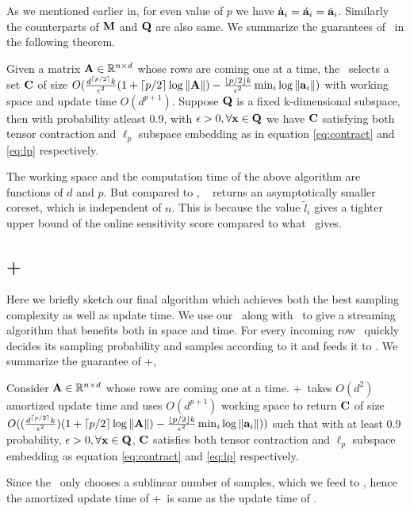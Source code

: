 As we mentioned earlier in, for even value of $p$ we have $\grave{\mathbf{a}}_{i}=\acute{\mathbf{a}}_{i}=\hat{\mathbf{a}}_{i}$. Similarly the counterparts of $\mathbf{M}$ and $\mathbf{Q}$ are also same. We summarize the guarantees of ~in the following theorem.
\begin{theorem}{\label{thm:slowOnline}}
 Given a matrix $\mathbf{A} \in \mathbb{R}^{n \times d}$ whose rows are coming one at a time, the ~selects a set $\mathbf{C}$ of size $O(\frac{d^{\lceil p/2 \rceil}k}{\epsilon^{2}}(1+\lceil p/2 \rceil\log \|\mathbf{A}\|) - \frac{\lfloor p/2 \rfloor k}{\epsilon^2}\min_{i}\log \|\mathbf{a}_{i}\|)$ with working space and update time $O(d^{p+1})$. Suppose $\mathbf{Q}$ is a fixed k-dimensional subspace, then with probability atleast 0.9, with $\epsilon > 0, \forall \mathbf{x} \in \mathbf{Q}$ we have $\mathbf{C}$ satisfying both tensor contraction and $\ell_{p}$ subspace embedding as in equation \eqref{eq:contract} and \eqref{eq:lp} respectively.
\end{theorem}
The working space and the computation time of the above algorithm are functions of $d$ and $p$. But compared to \online, ~ returns an asymptotically smaller coreset, which is independent of $n$. This is because the value $\tilde{l}_{i}$ gives a tighter upper bound of the online sensitivity score compared to what \online~gives.
% 
\subsection{\online+}
Here we briefly sketch our final algorithm which achieves both the best sampling complexity as well as update time. We use our \online~along with ~to give a streaming algorithm that benefits both in space and time. For every incoming row \online~quickly decides its sampling probability and samples according to it and feeds it to . We summarize the guarantee of \online+,
\begin{theorem}{\label{thm:improvedOnlineCoreset}}
 Consider $\mathbf{A} \in \mathbb{R}^{n \times d}$ whose rows are coming one at a time. \online+~takes $O(d^{2})$ amortized update time and uses $O(d^{p+1})$ working space to return $\mathbf{C}$ of size $O((\frac{d^{\lceil p/2 \rceil}k}{\epsilon^{2}})(1+\lceil p/2 \rceil\log \|\mathbf{A}\|) - \frac{\lfloor p/2 \rfloor k}{\epsilon^2}\min_{i}\log \|\mathbf{a}_{i}\|))$ such that with at least 0.9 probability, $\epsilon > 0, \forall \mathbf{x} \in \mathbf{Q}$, $\mathbf{C}$ satisfies both tensor contraction and $\ell_{p}$ subspace embedding as equation \eqref{eq:contract} and \eqref{eq:lp} respectively.
\end{theorem}
Since the \online~only chooses a sublinear number of samples, which we feed to , hence the amortized update time of \online+~is same as the update time of \online.
% 
